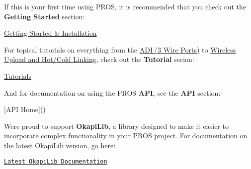 If this is your first time using P\+R\+OS, it is recommended that you check out the {\bfseries Getting Started} section\+:

\hyperlink{getting-started_2index_8md}{Getting Started \& Installation}

For topical tutorials on everything from the \hyperlink{md_docs_tutorials_topical_adi}{A\+DI (3 Wire Ports)} to \hyperlink{md_docs_tutorials_topical_wireless-upload}{Wireless Upload and Hot/\+Cold Linking}, check out the {\bfseries Tutorial} secion\+:

\hyperlink{md_docs_tutorials_index}{Tutorials}

And for documentation on using the P\+R\+OS {\bfseries A\+PI}, see the {\bfseries A\+PI} section\+:

\mbox{[}A\+PI Home\mbox{]}()

We\textquotesingle{}re proud to support {\bfseries Okapi\+Lib}, a library designed to make it easier to incorporate complex functionality in your P\+R\+OS project. For documentation on the latest Okapi\+Lib version, go here\+:

\href{https://okapilib.github.io/OkapiLib/index.html}{\tt Latest Okapi\+Lib Documentation} 